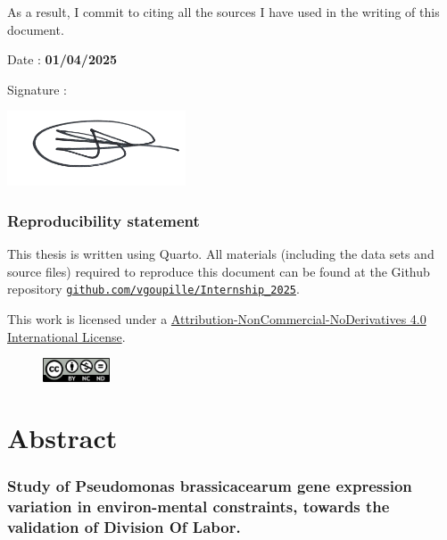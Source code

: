 \documentclass[
  11pt,
  a4paper,
]{report}
\begin{document}
As a result, I commit to citing all the sources I have used in the
writing of this document.

Date : \textbf{01/04/2025}

Signature :

\includegraphics[width=2.08333in,height=\textheight,keepaspectratio]{figures/signature.png}

\subsection*{Reproducibility statement}\label{reproducibility-statement}

This thesis is written using Quarto. All materials (including the data
sets and source files) required to reproduce this document can be found
at the Github repository
\href{https://github.com/vgoupille/Internship_2025}{\texttt{github.com/vgoupille/Internship\_2025}}.

This work is licensed under a
\href{https://creativecommons.org/licenses/by-nc-nd/4.0/deed.en}{Attribution-NonCommercial-NoDerivatives
4.0 International License}.

\begin{figure}[h]
    \centering
    \includegraphics[width=75px]{figures/CC_BY-NC-ND.png}
\end{figure}


\chapter*{Abstract}\label{abstract}


\subsection*{Study of Pseudomonas brassicacearum gene expression
variation in environ-mental constraints, towards the validation of
Division Of
Labor.}\label{study-of-pseudomonas-brassicacearum-gene-expression-variation-in-environ-mental-constraints-towards-the-validation-of-division-of-labor.}
\end{document}
